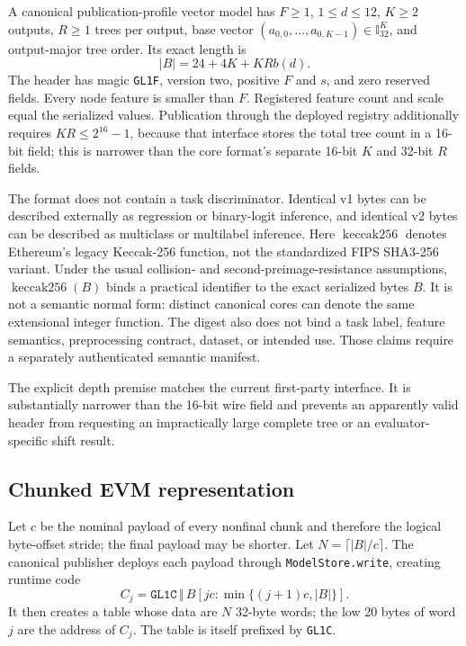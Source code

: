\begin{definition}
\label{def:gl1f-v2}
A canonical publication-profile vector model has $F\ge1$, $1\le d\le12$,
$K\ge2$ outputs, $R\ge1$ trees per output,
base vector $(a_{0,0},\ldots,a_{0,K-1})\in\mathbb{I}_{32}^K$, and output-major
tree order.  Its exact length is
\begin{equation}
  |B|=24+4K+KRb(d).
  \label{eq:v2-length}
\end{equation}
The header has magic \texttt{GL1F}, version two, positive $F$ and $s$, and
zero reserved fields.  Every node feature is smaller than $F$.  Registered
feature count and scale equal the serialized values.  Publication through the
deployed registry additionally requires $KR\le2^{16}-1$, because
that interface stores the total tree count in a 16-bit field; this is narrower
than the core format's separate 16-bit $K$ and 32-bit $R$ fields.
\end{definition}

The format does not contain a task discriminator.  Identical v1 bytes can be
described externally as regression or binary-logit inference, and identical
v2 bytes can be described as multiclass or multilabel inference.  Here
$\operatorname{keccak256}$ denotes Ethereum's legacy Keccak-256 function, not
the standardized FIPS SHA3-256 variant.  Under the usual collision- and
second-preimage-resistance assumptions, $\operatorname{keccak256}(B)$ binds a
practical identifier to the exact serialized bytes $B$.  It is not a semantic
normal form: distinct canonical cores can denote the same extensional integer
function.  The digest also does not bind a task label, feature semantics,
preprocessing contract, dataset, or intended use.  Those claims require a
separately authenticated semantic manifest.

The explicit depth premise matches the current first-party interface.  It is
substantially narrower than the 16-bit wire field and prevents an apparently
valid header from requesting an impractically large complete tree or an
evaluator-specific shift result.

\subsection{Chunked EVM representation}

Let $c$ be the nominal payload of every nonfinal chunk and therefore the
logical byte-offset stride; the final payload may be shorter.  Let
$N=\lceil |B|/c\rceil$.  The canonical publisher deploys each payload through
\texttt{ModelStore.write}, creating runtime code
\[
  C_j=\texttt{GL1C}\,\Vert\,
  B[jc:\min\{(j+1)c,|B|\}].
\]
It then creates a table whose data are $N$ 32-byte words; the low 20 bytes of
word $j$ are the address of $C_j$.  The table is itself prefixed by
\texttt{GL1C}.

